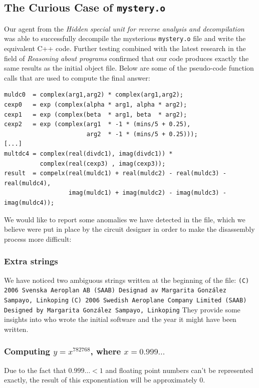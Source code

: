 \subsection{The Curious Case of \texttt{mystery.o}}

Our agent from the \emph{Hidden special unit for reverse analysis and decompilation} was able to successfully decompile the mysterious \texttt{mystery.o} file and write the equivalent C++ code. Further testing combined with the latest research in the field of \emph{Reasoning about programs} confirmed that our code produces exactly the same results as the initial object file. Below are some of the pseudo-code function calls that are used to compute the final answer:

\begin{verbatim}
muldc0  = complex(arg1,arg2) * complex(arg1,arg2);
cexp0   = exp (complex(alpha * arg1, alpha * arg2);
cexp1   = exp (complex(beta  * arg1, beta  * arg2);
cexp2   = exp (complex(arg1  * -1 * (mins/5 + 0.25), 
                       arg2  * -1 * (mins/5 + 0.25)));
[...]
multdc4 = complex(real(divdc1), imag(divdc1)) * 
          complex(real(cexp3) , imag(cexp3));
result  = compelx(real(muldc1) + real(muldc2) - real(muldc3) - real(muldc4),
                  imag(muldc1) + imag(muldc2) - imag(muldc3) - imag(muldc4));

\end{verbatim}

We would like to report some anomalies we have detected in the file, which we believe were put in place by the circuit designer in order to make the disassembly process more difficult:
\subsubsection{Extra strings}
We have noticed two ambiguous strings written at the beginning of the file:
\texttt{(C) 2006 Svenska Aeroplan AB (SAAB) Designad av Margarita Gonz\'{a}lez Sampayo, Linkoping}
\texttt{(C) 2006 Swedish Aeroplane Company Limited (SAAB) Designed by Margarita Gonz\'{a}lez Sampayo, Linkoping}
They provide some insights into who wrote the initial software and the year it might have been written.
\subsubsection{Computing $y = x^{782768}$, where $x = 0.999 \ldots$}
Due to the fact that $0.999 \ldots < 1$ and floating point numbers can't be represented exactly, the result of this exponentiation will be approximately $0$.
